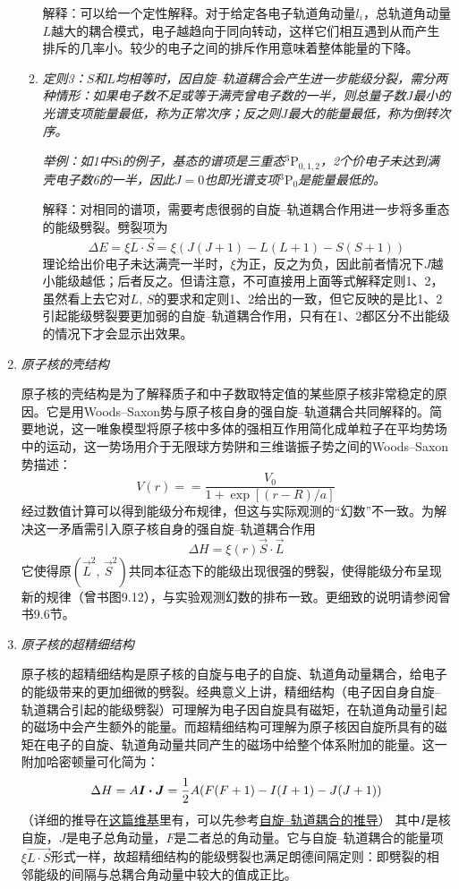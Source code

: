 \begin{enumerate}[label=\textbf{6.\Roman*}, listparindent=\parindent, leftmargin=-0.5mm]
\begin{enumerate}
    解释：可以给一个定性解释。对于给定各电子轨道角动量$l_i$，总轨道角动量$L$越大的耦合模式，电子越趋向于同向转动，这样它们相互遇到从而产生排斥的几率小。较少的电子之间的排斥作用意味着整体能量的下降。
    
    \item \emph{定则3：$S$和$L$均相等时，因自旋--轨道耦合会产生进一步能级分裂，需分两种情形：如果电子数不足或等于满壳曾电子数的一半，则总量子数$J$最小的光谱支项能量最低，称为正常次序；反之则$J$最大的能量最低，称为倒转次序。}
    
    \emph{举例：如1中$\mathrm{Si}$的例子，基态的谱项是三重态$\mathrm{^3P_{0,1,2}}$，2个价电子未达到满壳电子数6的一半，因此$J=0$也即光谱支项$\mathrm{^3P_{0}}$是能量最低的。}
    
    解释：对相同的谱项，需要考虑很弱的自旋--轨道耦合作用进一步将多重态的能级劈裂。劈裂项为
    \[\Delta E = \xi \vec{L\cdot S} = \xi(J(J+1)-L(L+1)-S(S+1))\]
    理论给出价电子未达满壳一半时，$\xi$为正，反之为负，因此前者情况下$J$越小能级越低；后者反之。但请注意，不可直接用上面等式解释定则1、2，虽然看上去它对$L$, $S$的要求和定则1、2给出的一致，但它反映的是比1、2引起能级劈裂要更加弱的自旋--轨道耦合作用，只有在1、2都区分不出能级的情况下才会显示出效果。
    
\end{enumerate}

\item \emph{原子核的壳结构}

原子核的壳结构是为了解释质子和中子数取特定值的某些原子核非常稳定的原因。它是用Woods--Saxon势与原子核自身的强自旋--轨道耦合共同解释的。简要地说，这一唯象模型将原子核中多体的强相互作用简化成单粒子在平均势场中的运动，这一势场用介于无限球方势阱和三维谐振子势之间的Woods--Saxon势描述：
\[V(r)==\frac{V_0}{1+\exp[(r-R)/a]}\]
经过数值计算可以得到能级分布规律，但这与实际观测的“幻数”不一致。为解决这一矛盾需引入原子核自身的强自旋--轨道耦合作用
\[\Delta H = \xi(r) \vec{S}\cdot \vec{L}\]
它使得原$(\vec{L}^2,\,\vec{S}^2)$共同本征态下的能级出现很强的劈裂，使得能级分布呈现新的规律（曾书图9.12），与实验观测幻数的排布一致。更细致的说明请参阅曾书9.6节。

\item \emph{原子核的超精细结构}

原子核的超精细结构是原子核的自旋与电子的自旋、轨道角动量耦合，给电子的能级带来的更加细微的劈裂。经典意义上讲，精细结构（电子因自身自旋--轨道耦合引起的能级劈裂）可理解为电子因自旋具有磁矩，在轨道角动量引起的磁场中会产生额外的能量。而超精细结构可理解为原子核因自旋所具有的磁矩在电子的自旋、轨道角动量共同产生的磁场中给整个体系附加的能量。这一附加哈密顿量可化简为：
\[\Delta H =A\boldsymbol{I\cdot J}=\frac{1}{2}A\qty(F(F+1)-I(I+1)-J(J+1))\]
（详细的推导在\href{https://en.wikipedia.org/wiki/Hyperfine_structure}{这篇维基}里有，可以先参考\href{https://en.wikipedia.org/wiki/Spin\%E2\%80\%93orbit_interaction}{自旋--轨道耦合的推导}）
其中$I$是核自旋，$J$是电子总角动量，$F$是二者总的角动量。它与自旋--轨道耦合的能量项$\xi\vec{L\cdot S}$形式一样，故超精细结构的能级劈裂也满足朗德间隔定则：即劈裂的相邻能级的间隔与总耦合角动量中较大的值成正比。


\end{enumerate}
